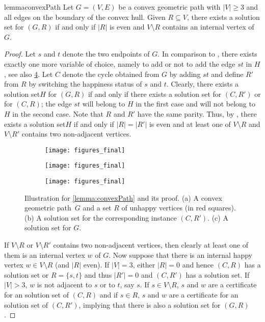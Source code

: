 \documentclass[a4paper,runningheads,cleveref,thm-restate]{lipics-v2021}
\newcommand{\hset}{solution set\xspace}
\begin{document}
\begin{restatable}{lemma}{convexPath}
	\label{lemma:convexPath} 
	Let $G=(V,E)$ be a convex geometric path with $|V|\ge 3$ and 
	all edges on the boundary of the convex hull. 
	Given $R\subseteq V$, 
	there exists a \hset for $(G,R)$ if and only if $|R|$ is even and $V\setminus R$ contains an internal vertex of~$G$. 
\end{restatable}
\begin{proof}
	Let $s$ and $t$ denote the two endpoints of $G$.
	In comparison to , there exists exactly one more variable of choice, namely to add or not to add the edge $st$ in $H$, see also \cref{fig:convexPath}.
	Let $C$ denote the cycle obtained from $G$ by adding $st$ and define $R'$ from $R$ by switching the happiness status of $s$ and $t$. Clearly, there exists a \hset $H$ for $(G,R)$ if and only if there exists a \hset for $(C,R')$ or for $(C,R)$; the edge $st$ will belong to $H$ in the first case and will not belong to $H$ in the second case. Note that $R$ and $R'$ have the same parity.
		Thus, by  , there exists a \hset $H$ if and only if $|R|=|R'|$ is even and at least one of $V\setminus R$ and $V\setminus R'$ contains two non-adjacent vertices.
	
	
	\begin{figure}[htb]
		\centering
		\begin{subfigure}{.3\textwidth}
			\centering
			\texttt{[image: figures\_final]}
			\caption{}
			\label{fig:convexPathvA}
		\end{subfigure}\hfill
		\begin{subfigure}{.3\textwidth}
			\centering
			\texttt{[image: figures\_final]}
			\caption{}
			\label{fig:convexPathB}
		\end{subfigure}\hfill
		\begin{subfigure}{.3\textwidth}
			\centering
			\texttt{[image: figures\_final]}
			\caption{}
			\label{fig:convexPathC}
		\end{subfigure}
		
		\caption{{Illustration for \cref{lemma:convexPath} and its proof. (a) A convex geometric path~$G$ and a set $R$ of unhappy vertices (in red squares). (b) A \hset for the corresponding instance $(C,R')$. (c) A \hset for $G$.}}
		\label{fig:convexPath}
	\end{figure}
	
		If $V\setminus R$ or $V\setminus R'$ contains two non-adjacent vertices, then clearly at least one of them is an internal vertex $w$ of $G$.
		Now suppose that there is an internal happy vertex $w\in V\setminus R$ (and $|R|$ even).
		If $|V|=3$, either $|R|=0$ and hence $(C,R)$ has a \hset or $R=\{s,t\}$ and thus $|R'|=0$ and $(C,R')$ has a \hset.
		If $|V|>3$,  $w$ is not adjacent to $s$ or to $t$, say $s$.  
		If $s\in V\setminus R$, $s$ and $w$ are a certificate for an \hset of $(C,R)$ and if $s\in R$, $s$ and $w$ are a certificate for an \hset of $(C,R')$, implying that there is also a \hset for $(G,R)$.
\end{proof}
\end{document}
